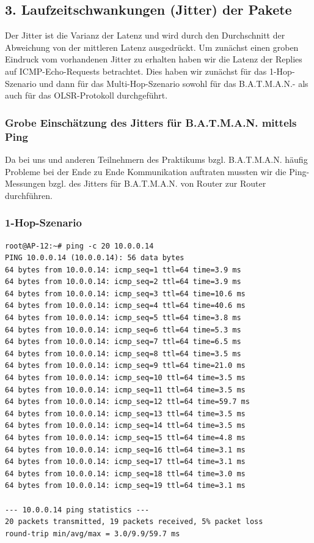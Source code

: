 \documentclass[a4paper,10pt]{article}
\begin{document}
\subsection{3. Laufzeitschwankungen (Jitter) der Pakete}

Der Jitter ist die Varianz der Latenz und wird durch den Durchschnitt der Abweichung von der mittleren Latenz ausgedrückt.
Um zunächst einen groben Eindruck vom vorhandenen Jitter zu erhalten haben wir die Latenz der Replies auf ICMP-Echo-Requests betrachtet.
Dies haben wir zunächst für das 1-Hop-Szenario und dann für das Multi-Hop-Szenario sowohl für das B.A.T.M.A.N.- als auch für das OLSR-Protokoll durchgeführt.

\subsubsection{Grobe Einschätzung des Jitters für B.A.T.M.A.N. mittels Ping}

Da bei uns und anderen Teilnehmern des Praktikums bzgl. B.A.T.M.A.N. häufig Probleme bei der Ende zu Ende Kommunikation auftraten mussten wir die Ping-Messungen bzgl. des Jitters für B.A.T.M.A.N. von Router zur Router durchführen.

\subsubsection*{1-Hop-Szenario}

\begin{lstlisting}
root@AP-12:~# ping -c 20 10.0.0.14
PING 10.0.0.14 (10.0.0.14): 56 data bytes
64 bytes from 10.0.0.14: icmp_seq=1 ttl=64 time=3.9 ms
64 bytes from 10.0.0.14: icmp_seq=2 ttl=64 time=3.9 ms
64 bytes from 10.0.0.14: icmp_seq=3 ttl=64 time=10.6 ms
64 bytes from 10.0.0.14: icmp_seq=4 ttl=64 time=40.6 ms
64 bytes from 10.0.0.14: icmp_seq=5 ttl=64 time=3.8 ms
64 bytes from 10.0.0.14: icmp_seq=6 ttl=64 time=5.3 ms
64 bytes from 10.0.0.14: icmp_seq=7 ttl=64 time=6.5 ms
64 bytes from 10.0.0.14: icmp_seq=8 ttl=64 time=3.5 ms
64 bytes from 10.0.0.14: icmp_seq=9 ttl=64 time=21.0 ms
64 bytes from 10.0.0.14: icmp_seq=10 ttl=64 time=3.5 ms
64 bytes from 10.0.0.14: icmp_seq=11 ttl=64 time=3.5 ms
64 bytes from 10.0.0.14: icmp_seq=12 ttl=64 time=59.7 ms
64 bytes from 10.0.0.14: icmp_seq=13 ttl=64 time=3.5 ms
64 bytes from 10.0.0.14: icmp_seq=14 ttl=64 time=3.5 ms
64 bytes from 10.0.0.14: icmp_seq=15 ttl=64 time=4.8 ms
64 bytes from 10.0.0.14: icmp_seq=16 ttl=64 time=3.1 ms
64 bytes from 10.0.0.14: icmp_seq=17 ttl=64 time=3.1 ms
64 bytes from 10.0.0.14: icmp_seq=18 ttl=64 time=3.0 ms
64 bytes from 10.0.0.14: icmp_seq=19 ttl=64 time=3.1 ms

--- 10.0.0.14 ping statistics --- 
20 packets transmitted, 19 packets received, 5% packet loss
round-trip min/avg/max = 3.0/9.9/59.7 ms
\end{lstlisting}
\end{document}
